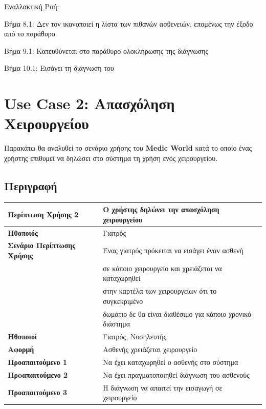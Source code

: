 \documentclass{article}
\newcommand\T{\rule{0pt}{2.6ex}}       %
\newcommand\B{\rule[-1.2ex]{0pt}{0pt}}
\begin{document}
 \vspace{0.1cm}
 
 \underline{Εναλλακτική Ροή}: \vspace{0.005cm} \\
\par Βήμα 8.1: Δεν τον ικανοποιεί η λίστα των πιθανών ασθενειών, επομένως  την έξοδο από το παράθυρο\\
\par Βήμα 9.1: Κατευθύνεται στο παράθυρο ολοκλήρωσης της διάγνωσης\\
\par Βήμα 10.1: Εισάγει τη διάγνωση του \\

 
 \section{Use Case 2: Απασχόληση Χειρουργείου}
 
 Παρακάτω θα αναλυθεί το σενάριο χρήσης του \textbf{Medic World} κατά το οποίο ένας χρήστης επιθυμεί να δηλώσει στο σύστημα τη χρήση ενός χειρουργείου.

\subsection{Περιγραφή}

\begin{center}
     \begin{tabular}{|l|l|}
     \hline
      \textbf{Περίπτωση Χρήσης 2} & Ο χρήστης δηλώνει την απασχόληση χειρουργείου \T\B \\ 
      \hline
      \textbf{Ηθοποιός} & Γιατρός \T\B \\
      \hline
      \textbf{Σενάριο Περίπτωσης Χρήσης} & Ένας γιατρός πρόκειται να εισάγει έναν ασθενή \T \\& σε κάποιο χειρουργείο και χρειάζεται να καταχωρηθεί\\& στην καρτέλα των χειρουργείων ότι το συγκεκριμένο\\& δωμάτιο δε θα είναι διαθέσιμο για κάποιο χρονικό διάστημα \B \\
      \hline
      \textbf{Ηθοποιοί} & Γιατρός, Νοσηλευτής \T\B \\
      \hline
      \textbf{Αφορμή} & Ασθενής χρειάζεται χειρουργείο \T\B \\
      \hline
      \textbf{Προαπαιτούμενο 1} & Να έχει καταχωρηθεί ο ασθενής στο σύστημα \T\B \\
      \hline
      \textbf{Πρoαπαιτούμενο 2} & Να έχει πραγματοποιηθεί διάγνωση του ασθενούς \T\B \\
      \hline
      \textbf{Προαπαιτούμενο 3} & Η διάγνωση να απαιτεί την εισαγωγή σε χειρουργείο \T\B \\
      \hline
     \end{tabular}
 \end{center}
 
\end{document}
